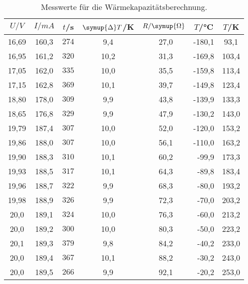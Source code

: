 \begin{table}
    \centering
    \caption{Messwerte für die Wärmekapazitätsberechnung.}
    \label{Tab1}
    \begin{tabular}{S[table-format=2.1] S S S[table-format=2.1] S S S} %
      \toprule
       {$U/ \si{V}$}& {$I/\si{mA}$} & {$t$/s} & {$\symup{\Delta}T$/K} & {$R/\symup{\Omega}$} & {$T$/°C} & {$T$/K}\\
      \midrule
      \midrule
          {16,69} & {160,3}  & {$274$} &  9,4 & {~27,0} & {-180,1} &  93,1 \\
          {16,95} & {161,2}  & {$320$} & 10,2 & {~31,3} & {-169,8} & 103,4 \\
          {17,05} & {162,0}  & {$335$} & 10,0 & {~35,5} & {-159,8} & 113,4 \\
          {17,15} & {162,8}  & {$369$} & 10,1 & {~39,7} & {-149,8} & 123,4 \\
          {18,80} & {178,0}  & {$309$} &  9,9 & {~43,8} & {-139,9} & 133,3 \\
          {18,65} & {176,8}  & {$329$} &  9,9 & {~47,9} & {-130,2} & 143,0 \\
          {19,79} & {187,4}  & {$307$} & 10,0 & {~52,0} & {-120,0} & 153,2 \\
          {19,86} & {188,0}  & {$307$} & 10,0 & {~56,1} & {-110,0} & 163,2 \\
          {19,90} & {188,3}  & {$310$} & 10,1 & {~60,2} & {~-99,9} & 173,3 \\
          {19,93} & {188,5}  & {$317$} & 10,1 & {~64,3} & {~-89,8} & 183,4 \\
          {19,96} & {188,7}  & {$322$} &  9,9 & {~68,3} & {~-80,0} & 193,2 \\
          {19,98} & {188,9}  & {$326$} &  9,9 & {~72,3} & {~-70,0} & 203,2 \\
          {20,0 } & {189,1}  & {$324$} & 10,0 & {~76,3} & {~-60,0} & 213,2 \\
          {20,0 } & {189,2}  & {$300$} & 10,0 & {~80,3} & {~-50,0} & 223,2 \\
          {20,1 } & {189,3}  & {$379$} &  9,8 & {~84,2} & {~-40,2} & 233,0 \\
          {20,0 } & {189,4}  & {$367$} & 10,1 & {~88,2} & {~-30,2} & 243,0 \\
          {20,0 } & {189,5}  & {$266$} &  9,9 & {~92,1} & {~-20,2} & 253,0 \\

\end{tabular}
\end{table}
